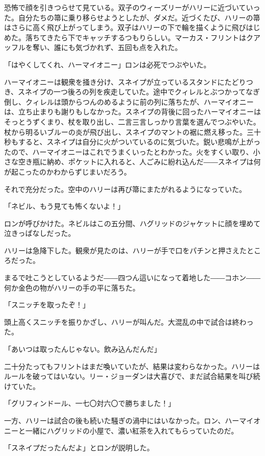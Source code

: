 \documentclass[10pt,a4paper]{article}
\begin{document}
\begin{CJK}{UTF8}{min}
恐怖で顔を引きつらせて見ている。双子のウィーズリーがハリーに近づいていった。自分たちの箒に乗り移らせようとしたが、ダメだ。近づくたび、ハリーの箒はさらに高く飛び上がってしまう。双子はハリーの下で輪を描くように飛びはじめた。落ちてきたら下でキャッチするつもりらしい。マーカス・フリントはクアッフルを奪い、誰にも気づかれず、五回も点を入れた。

「はやくしてくれ、ハーマイオニー」ロンは必死でつぶやいた。

ハーマイオニーは観衆を掻き分け、スネイプが立っているスタンドにたどりつき、スネイプの一つ後ろの列を疾走していた。途中でクィレルとぶつかってなぎ倒し、クィレルは頭からつんのめるように前の列に落ちたが、ハーマイオニーは、立ち止まりも謝りもしなかった。スネイプの背後に回ったハーマイオニーはそっとうずくまり、杖を取り出し、二言三言しっかり言葉を選んでつぶやいた。杖から明るいブルーの炎が飛び出し、スネイプのマントの裾に燃え移った。三十秒もすると、スネイプは自分に火がついているのに気づいた。鋭い悲鳴が上がったので、ハーマイオニーはこれでうまくいったとわかった。火をすくい取り、小さな空き瓶に納め、ポケットに入れると、人ごみに紛れ込んだ――スネイプは何が起こったのかわからずじまいだろう。

それで充分だった。空中のハリーは再び箒にまたがれるようになっていた。

「ネビル、もう見ても怖くないよ！」

ロンが呼びかけた。ネビルはこの五分間、ハグリッドのジャケットに顔を埋めて泣きっぱなしだった。

ハリーは急降下した。観衆が見たのは、ハリーが手で口をパチンと押さえたところだった。

まるで吐こうとしているようだ――四つん這いになって着地した――コホン――何か金色の物がハリーの手の平に落ちた。

「スニッチを取ったぞ！」

頭上高くスニッチを振りかざし、ハリーが叫んだ。大混乱の中で試合は終わった。

「あいつは取ったんじゃない。飲み込んだんだ」

二十分たってもフリントはまだ喚いていたが、結果は変わらなかった。ハリーはルールを破ってはいない。リー・ジョーダンは大喜びで、まだ試合結果を叫び続けていた。

「グリフィンドール、一七〇対六〇で勝ちました！」



一方、ハリーは試合の後も続いた騒ぎの渦中にはいなかった。ロン、ハーマイオニーと一緒にハグリッドの小屋で、濃い紅茶を入れてもらっていたのだ。

「スネイプだったんだよ」とロンが説明した。


\end{CJK}
\end{document}
